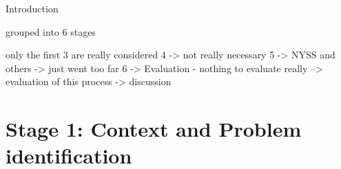 Introduction

grouped into 6 stages

only the first 3 are really considered
4 -> not really necessary
5 -> NYSS and others -> just went too  far
6 -> Evaluation - nothing to evaluate really --> evaluation of this process -> discussion



\section{Stage 1: Context and Problem identification}

